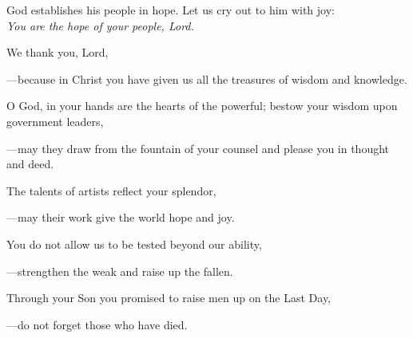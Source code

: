 \intercessions\indent

\begin{hangpar}

God establishes his people in hope. Let us cry out to him with joy:\\
\emph{You are the hope of your people, Lord.}

\medskip We thank you, Lord,

{\color{red}---\thinspace}because in Christ you have given us all the treasures of wisdom and knowledge.

\medskip O God, in your hands are the hearts of the powerful; bestow your wisdom upon government leaders,

{\color{red}---\thinspace}may they draw from the fountain of your counsel and please you in thought and deed.

\medskip The talents of artists reflect your splendor,

{\color{red}---\thinspace}may their work give the world hope and joy.

\medskip You do not allow us to be tested beyond our ability,

{\color{red}---\thinspace}strengthen the weak and raise up the fallen.

\medskip Through your Son you promised to raise men up on the Last Day,

{\color{red}---\thinspace}do not forget those who have died.

\end{hangpar}

